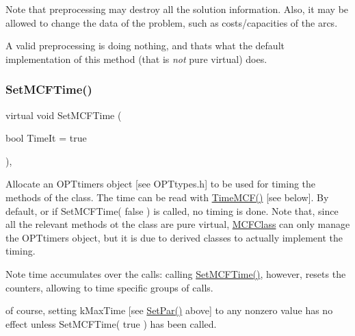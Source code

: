 Note that preprocessing may destroy all the solution information. Also, it may be allowed to change the data of the problem, such as costs/capacities of the arcs.

A valid preprocessing is doing nothing, and that\textquotesingle{}s what the default implementation of this method (that is {\itshape not} pure virtual) does. \mbox{\label{class_m_c_f_class_a5441232979a0ac98410d765b04830eeb}} 
\subsubsection{\texorpdfstring{Set\+M\+C\+F\+Time()}{SetMCFTime()}}
{\footnotesize\ttfamily virtual void Set\+M\+C\+F\+Time (\begin{DoxyParamCaption}\item[{bool}]{Time\+It = {\ttfamily true} }\end{DoxyParamCaption})\hspace{0.3cm}{\ttfamily [inline]}, {\ttfamily [virtual]}}

Allocate an O\+P\+Ttimers object \mbox{[}see O\+P\+Ttypes.\+h\mbox{]} to be used for timing the methods of the class. The time can be read with \mbox{\hyperlink{class_m_c_f_class_a25ce05b3fabc8d4f80332a02bce2a623}{Time\+M\+C\+F()}} \mbox{[}see below\mbox{]}. By default, or if Set\+M\+C\+F\+Time( false ) is called, no timing is done. Note that, since all the relevant methods ot the class are pure virtual, \mbox{\hyperlink{class_m_c_f_class}{M\+C\+F\+Class}} can only manage the O\+P\+Ttimers object, but it is due to derived classes to actually implement the timing.

\begin{DoxyNote}{Note}
time accumulates over the calls\+: calling \mbox{\hyperlink{class_m_c_f_class_a5441232979a0ac98410d765b04830eeb}{Set\+M\+C\+F\+Time()}}, however, resets the counters, allowing to time specific groups of calls.

of course, setting k\+Max\+Time \mbox{[}see \mbox{\hyperlink{class_m_c_f_class_ab8e162715d8454f30679c10372db4db8}{Set\+Par()}} above\mbox{]} to any nonzero value has no effect unless Set\+M\+C\+F\+Time( true ) has been called. 
\end{DoxyNote}
\mbox{\label{class_m_c_f_class_ab8e162715d8454f30679c10372db4db8}} 
